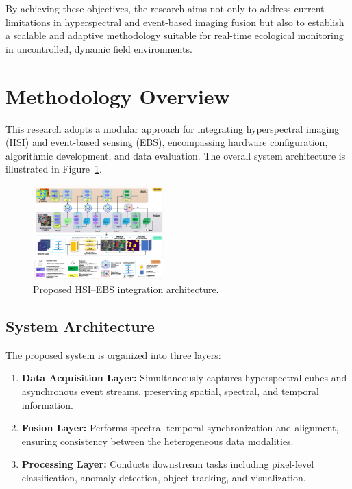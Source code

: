 \documentclass[conference]{IEEEtran}
\begin{document}
By achieving these objectives, the research aims not only to address current limitations in hyperspectral and event-based imaging fusion but also to establish a scalable and adaptive methodology suitable for real-time ecological monitoring in uncontrolled, dynamic field environments.


\section{Methodology Overview}

This research adopts a modular approach for integrating hyperspectral imaging (HSI) and event-based sensing (EBS), encompassing hardware configuration, algorithmic development, and data evaluation. The overall system architecture is illustrated in Figure~\ref{fig:system_architecture}.

\begin{figure}[H]
    \centering
    \includegraphics[width=0.45\textwidth]{Architecture.png}
    \caption{Proposed HSI–EBS integration architecture.}
    \label{fig:system_architecture}
\end{figure}

\subsection{System Architecture}
The proposed system is organized into three layers:
\begin{enumerate}
    \item \textbf{Data Acquisition Layer:} Simultaneously captures hyperspectral cubes and asynchronous event streams, preserving spatial, spectral, and temporal information.
    \item \textbf{Fusion Layer:} Performs spectral-temporal synchronization and alignment, ensuring consistency between the heterogeneous data modalities.
    \item \textbf{Processing Layer:} Conducts downstream tasks including pixel-level classification, anomaly detection, object tracking, and visualization.
\end{enumerate}
\end{document}
